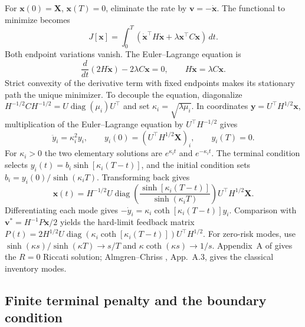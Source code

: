 \documentclass[11pt,a4paper]{article}
\begin{document}
For $\mathbf x(0)=\mathbf X$, $\mathbf x(T)=0$, eliminate the rate by
$\mathbf v=-\dot{\mathbf x}$. The functional to minimize becomes
\[
 J[\mathbf x]=\int_0^T
 (\dot{\mathbf x}^\top H\dot{\mathbf x}
 +\lambda\mathbf x^\top C\mathbf x)\,dt.
\]
Both endpoint variations vanish. The Euler--Lagrange equation is
\[
 \frac{d}{dt}(2H\dot{\mathbf x})-2\lambda C\mathbf x=0,
 \qquad H\ddot{\mathbf x}=\lambda C\mathbf x.
\]
Strict convexity of the derivative term with fixed endpoints makes its
stationary path the unique minimizer. To decouple the equation, diagonalize
$H^{-1/2}CH^{-1/2}=U\operatorname{diag}(\mu_i)U^\top$ and set
$\kappa_i=\sqrt{\lambda\mu_i}$. In coordinates
$\mathbf y=U^\top H^{1/2}\mathbf x$, multiplication of the
Euler--Lagrange equation by $U^\top H^{-1/2}$ gives
\[
 \ddot y_i=\kappa_i^2y_i,\qquad
 y_i(0)=(U^\top H^{1/2}\mathbf X)_i,\qquad y_i(T)=0.
\]
For $\kappa_i>0$ the two elementary solutions are
$e^{\kappa_i t}$ and $e^{-\kappa_i t}$. The terminal condition selects
$y_i(t)=b_i\sinh[\kappa_i(T-t)]$, and the initial condition sets
$b_i=y_i(0)/\sinh(\kappa_iT)$. Transforming back gives
\begin{equation}
 \mathbf x(t)=H^{-1/2}U\operatorname{diag}\!\left(
 \frac{\sinh[\kappa_i(T-t)]}{\sinh(\kappa_iT)}\right)U^\top H^{1/2}\mathbf X.
 \label{eq:traj}
\end{equation}
Differentiating each mode gives
$-\dot y_i=\kappa_i\coth[\kappa_i(T-t)]y_i$. Comparison with
$\mathbf v^*=H^{-1}P\mathbf x/2$ yields the hard-limit feedback matrix
$P(t)=2H^{1/2}U\operatorname{diag}(\kappa_i\coth[\kappa_i(T-t)])U^\top H^{1/2}$.
For zero-risk modes, use
$\sinh(\kappa s)/\sinh(\kappa T)\to s/T$ and
$\kappa\coth(\kappa s)\to1/s$.
Appendix~A of \cite{bergault2022} gives the $R=0$ Riccati solution;
Almgren--Chriss \cite{almgrenchriss2000}, App.~A.3, gives the classical
inventory modes.

\subsection*{Finite terminal penalty and the boundary condition}
\end{document}
